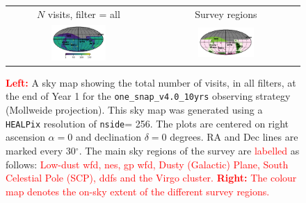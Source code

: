 \documentclass[preprintm,linenumbers]{aastex631}
\newcommand{\baselinefull}{\texttt{one\_snap\_v4.0\_10yrs}\xspace}
\newcommand{\nside}{\texttt{nside}\xspace}
\newcommand{\healpix}{\texttt{HEALPix}\xspace} %
\providecommand{\red}[1]{\textcolor{red}{#1}}
\begin{document}
		\begin{figure}
  	\centering
\begin{tabular}{c c}
	$N$ visits, filter = all &
	Survey regions\\
	\includegraphics[align=t,width=0.4\textwidth]{results/skymaps/skymap_first_year_one_snap_v4_0_10yrs_nside-256_CountMetric_all_noDD_noTwi.pdf} &
	\includegraphics[align=t,width=0.4\textwidth]{results/skymaps/skymap_first_year_one_snap_v4_0_10yrs_nside-256_CountMetric_all_noDD_noTwi_bounds.pdf} \\
\end{tabular}
				\caption{\red{\textbf{Left:}} A sky map showing the total number of visits, in all filters, at the end of Year 1 for the \baselinefull observing strategy (Mollweide projection). 
    This sky map was generated using a \healpix \citep[Hierarchical Equal Area isoLatitude Pixelization; ][]{2005ApJ...622..759G}  resolution of \nside = 256.
    The plots are centered on right ascension $\alpha = 0$ and declination $\delta = 0$ degrees. RA and Dec lines are marked every 30$^\circ$.
    The main sky regions of the survey are \red{labelled} as follows: \red{Low-dust \gls*{wfd}, \gls*{nes}, \glsreset{gp}\gls*{gp} \gls*{wfd}, Dusty (Galactic) Plane, South Celestial Pole (SCP), \glsreset{ddf}\glspl*{ddf} and the Virgo cluster.}
    \red{\textbf{Right:} The colour map denotes the on-sky extent of the different survey regions.}
    }
    \label{fig:baseline_labels}
		\end{figure}
\end{document}
